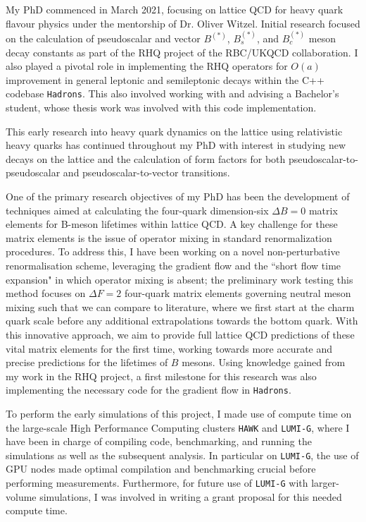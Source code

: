 \documentclass[11pt, a4paper]{awesome-cv}
\begin{document}
\begin{cvletter}
My PhD commenced in March 2021, focusing on lattice QCD for heavy quark flavour physics under the mentorship of Dr. Oliver Witzel. 
Initial research focused on the calculation of pseudoscalar and vector $B^{(*)}$, $B_s^{(*)}$, and $B_c^{(*)}$ meson decay constants as part of the RHQ project of the RBC/UKQCD collaboration. 
I also played a pivotal role in implementing the RHQ operators for $O(a)$ improvement in general leptonic and semileptonic decays within the C++ codebase {\tt Hadrons}. 
This also involved working with and advising a Bachelor's student, whose thesis work was involved with this code implementation.

This early research into heavy quark dynamics on the lattice using relativistic heavy quarks has continued throughout my PhD with interest in studying new decays on the lattice and the calculation of form factors for both pseudoscalar-to-pseudoscalar and pseudoscalar-to-vector transitions.

One of the primary research objectives of my PhD has been the development of techniques aimed at calculating the four-quark dimension-six $\Delta B=0$ matrix elements for B-meson lifetimes within lattice QCD. 
A key challenge for these matrix elements is the issue of operator mixing in standard renormalization procedures. 
To address this, I have been working on a novel non-perturbative renormalisation scheme, leveraging the gradient flow and the ``short flow time expansion" in which operator mixing is absent; the preliminary work testing this method focuses on $\Delta F=2$ four-quark matrix elements governing neutral meson mixing such that we can compare to literature, where we first start at the charm quark scale before any additional extrapolations towards the bottom quark.
With this innovative approach, we aim to provide full lattice QCD predictions of these vital matrix elements for the first time, working towards more accurate and precise predictions for the lifetimes of $B$ mesons.
Using knowledge gained from my work in the RHQ project, a first milestone for this research was also implementing the necessary code for the gradient flow in {\tt Hadrons}.

To perform the early simulations of this project, I made use of compute time on the large-scale High Performance Computing clusters {\tt HAWK} and {\tt LUMI-G}, where I have been in charge of compiling code, benchmarking, and running the simulations as well as the subsequent analysis. 
In particular on {\tt LUMI-G}, the use of GPU nodes made optimal compilation and benchmarking crucial before performing measurements.
Furthermore, for future use of {\tt LUMI-G} with larger-volume simulations, I was involved in writing a grant proposal for this needed compute time.


\end{cvletter}
\end{document}
